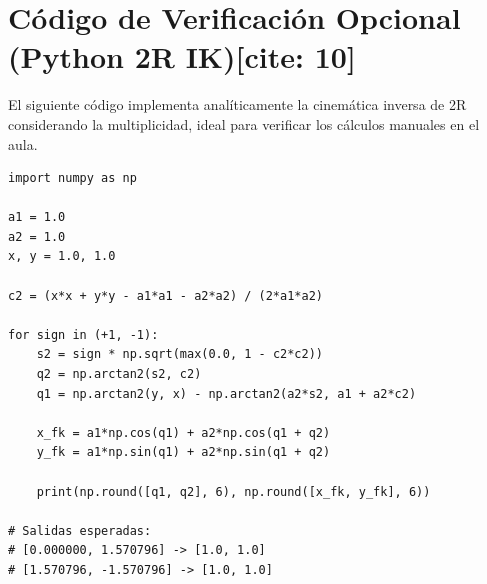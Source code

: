 \documentclass[11pt, a4paper]{article}
\begin{document}
\section*{Código de Verificación Opcional (Python 2R IK)[cite: 10]}
El siguiente código implementa analíticamente la cinemática inversa de 2R considerando la multiplicidad, ideal para verificar los cálculos manuales en el aula.

\begin{lstlisting}
import numpy as np

a1 = 1.0
a2 = 1.0
x, y = 1.0, 1.0

c2 = (x*x + y*y - a1*a1 - a2*a2) / (2*a1*a2)

for sign in (+1, -1):
    s2 = sign * np.sqrt(max(0.0, 1 - c2*c2))
    q2 = np.arctan2(s2, c2)
    q1 = np.arctan2(y, x) - np.arctan2(a2*s2, a1 + a2*c2)

    x_fk = a1*np.cos(q1) + a2*np.cos(q1 + q2)
    y_fk = a1*np.sin(q1) + a2*np.sin(q1 + q2)

    print(np.round([q1, q2], 6), np.round([x_fk, y_fk], 6))

# Salidas esperadas:
# [0.000000, 1.570796] -> [1.0, 1.0]
# [1.570796, -1.570796] -> [1.0, 1.0]
\end{lstlisting}
\end{document}
